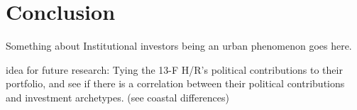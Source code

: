 \chapter {Conclusion}

Something about Institutional investors being an urban phenomenon goes here. 



idea for future research: Tying the 13-F H/R's political contributions to their portfolio, and see if there is a correlation between their political contributions and investment archetypes. (see coastal differences) 